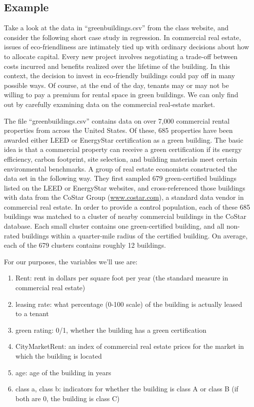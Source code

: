 \documentclass[11pt]{article}
\begin{document}
\subsection{Example}

 Take a look at the data in ``greenbuildings.csv'' from the class website, and consider the following short case study in regression.  In commercial real estate, issues of eco-friendliness are intimately tied up with ordinary decisions about how to allocate capital.   Every new project involves negotiating a trade-off between costs incurred and benefits realized over the lifetime of the building. In this context, the decision to invest in eco-friendly buildings could pay off in many possible ways.  Of course, at the end of the day, tenants may or may not be willing to pay a premium for rental space in green buildings.  We can only find out by carefully examining data on the commercial real-estate market.

The file ``greenbuildings.csv''  contains data on over 7,000 commercial rental properties from across the United States.  Of these, 685 properties have been awarded either LEED or EnergyStar certification as a green building.  The basic idea is that a commercial property can receive a green certification if its energy efficiency, carbon footprint, site selection, and building materials meet certain environmental benchmarks.  A group of real estate economists constructed the data set in the following way.  They first sampled 679 green-certified buildings listed on the LEED or EnergyStar websites, and cross-referenced those buildings with data from the CoStar Group (\url{www.costar.com}), a standard data vendor in commercial real estate.  In order to provide a control population, each of these 685 buildings was matched to a cluster of nearby commercial buildings in the CoStar database.  Each small cluster contains one green-certified building, and all non-rated buildings within a quarter-mile radius of the certified building.  On average, each of the 679 clusters contains roughly 12 buildings.

For our purposes, the variables we'll use are:
\begin{enumerate}
\item Rent: rent in dollars per square foot per year (the standard measure in commercial real estate)  
\item leasing rate: what percentage (0-100 scale) of the building is actually leased to a tenant
\item green rating: 0/1, whether the building has a green certification  
\item CityMarketRent: an index of commercial real estate prices for the market in which the building is located  
\item age: age of the building in years
\item class a, class b: indicators for whether the building is class A or class B (if both are 0, the building is class C)  
\end{enumerate}
\end{document}
